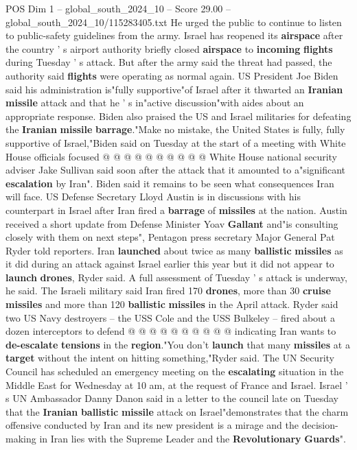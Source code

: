 \begin{textsample}{POS Dim 1 – global\_south\_2024\_10 – Score 29.00 – global\_south\_2024\_10/115283405.txt}
He urged the public to continue to listen to public-safety guidelines from the army.
Israel has reopened its \textbf{airspace} after the country ' s airport authority briefly closed \textbf{airspace} to \textbf{incoming} \textbf{flights} during Tuesday ' s attack.
But after the army said the threat had passed, the authority said \textbf{flights} were operating as normal again.
US President Joe Biden said his administration is"fully supportive"of Israel after it thwarted an \textbf{Iranian} \textbf{missile} attack and that he ' s in"active discussion"with aides about an appropriate response.
Biden also praised the US and Israel militaries for defeating the \textbf{Iranian} \textbf{missile} \textbf{barrage}."Make no mistake, the United States is fully, fully supportive of Israel,"Biden said on Tuesday at the start of a meeting with White House officials focused @ @ @ @ @ @ @ @ @ @ White House national security adviser Jake Sullivan said soon after the attack that it amounted to a"significant \textbf{escalation} by Iran".
Biden said it remains to be seen what consequences Iran will face.
US Defense Secretary Lloyd Austin is in discussions with his counterpart in Israel after Iran fired a \textbf{barrage} of \textbf{missiles} at the nation.
Austin received a short update from Defense Minister Yoav \textbf{Gallant} and"is consulting closely with them on next steps", Pentagon press secretary Major General Pat Ryder told reporters.
Iran \textbf{launched} about twice as many \textbf{ballistic} \textbf{missiles} as it did during an attack against Israel earlier this year but it did not appear to \textbf{launch} \textbf{drones}, Ryder said.
A full assessment of Tuesday ' s attack is underway, he said.
The Israeli military said Iran fired 170 \textbf{drones}, more than 30 \textbf{cruise} \textbf{missiles} and more than 120 \textbf{ballistic} \textbf{missiles} in the April attack.
Ryder said two US Navy destroyers -- the USS Cole and the USS Bulkeley -- fired about a dozen interceptors to defend @ @ @ @ @ @ @ @ @ @ indicating Iran wants to \textbf{de-escalate} \textbf{tensions} in the \textbf{region}."You don't \textbf{launch} that many \textbf{missiles} at a \textbf{target} without the intent on hitting something,"Ryder said.
The UN Security Council has scheduled an emergency meeting on the \textbf{escalating} situation in the Middle East for Wednesday at 10 am, at the request of France and Israel.
Israel ' s UN Ambassador Danny Danon said in a letter to the council late on Tuesday that the \textbf{Iranian} \textbf{ballistic} \textbf{missile} attack on Israel"demonstrates that the charm offensive conducted by Iran and its new president is a mirage and the decision-making in Iran lies with the Supreme Leader and the \textbf{Revolutionary} \textbf{Guards}".

\end{textsample}

